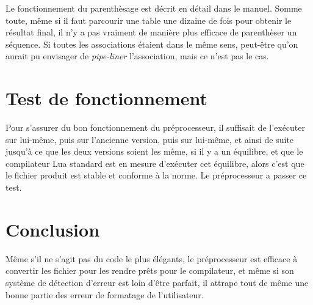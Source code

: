 \documentclass{article}
\begin{document}
Le fonctionnement du parenthèsage est décrit en détail dans le manuel. Somme toute, même si il faut parcourir une table une dizaine de fois pour obtenir le résultat final, il n'y a pas vraiment de manière plus efficace de parenthèser un séquence. Si toutes les associations étaient dans le même sens, peut-être qu'on aurait pu envisager de \textit{pipe-liner} l'association, mais ce n'est pas le cas.

\section{Test de fonctionnement}
Pour s'assurer du bon fonctionnement du préprocesseur, il suffisait de l'exécuter sur lui-même, puis sur l'ancienne version, puis sur lui-même, et ainsi de suite jusqu'à ce que les deux versions soient les même, si il y a un équilibre, et que le compilateur Lua standard est en mesure d'exécuter cet équilibre, alors c'est que le fichier produit est stable et conforme à la norme. Le préprocesseur a passer ce test.

\section{Conclusion}
Même s'il ne s'agit pas du code le plus élégants, le préprocesseur est efficace à convertir les fichier pour les rendre prêts pour le compilateur, et même si son système de détection d'erreur est loin d'être parfait, il attrape tout de même une bonne partie des erreur de formatage de l'utilisateur.
\end{document}
